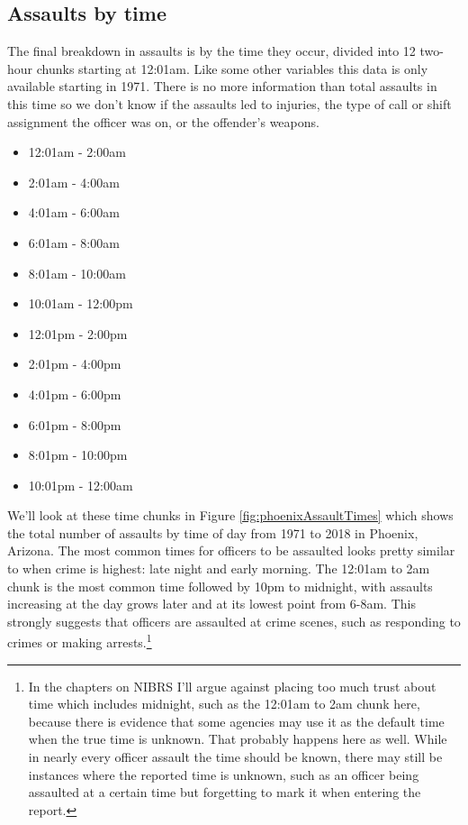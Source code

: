 \documentclass[
  12pt,
  openany]{book}
\providecommand{\tightlist}{%
  \setlength{\itemsep}{0pt}\setlength{\parskip}{0pt}}
\begin{document}
\subsection{Assaults by time}\label{assaults-by-time}

The final breakdown in assaults is by the time they occur, divided into 12 two-hour chunks starting at 12:01am. Like some other variables this data is only available starting in 1971. There is no more information than total assaults in this time so we don't know if the assaults led to injuries, the type of call or shift assignment the officer was on, or the offender's weapons.

\begin{itemize}
\tightlist
\item
  12:01am - 2:00am
\item
  2:01am - 4:00am
\item
  4:01am - 6:00am
\item
  6:01am - 8:00am
\item
  8:01am - 10:00am
\item
  10:01am - 12:00pm
\item
  12:01pm - 2:00pm
\item
  2:01pm - 4:00pm
\item
  4:01pm - 6:00pm
\item
  6:01pm - 8:00pm
\item
  8:01pm - 10:00pm
\item
  10:01pm - 12:00am
\end{itemize}

We'll look at these time chunks in Figure \ref{fig:phoenixAssaultTimes} which shows the total number of assaults by time of day from 1971 to 2018 in Phoenix, Arizona. The most common times for officers to be assaulted looks pretty similar to when crime is highest: late night and early morning. The 12:01am to 2am chunk is the most common time followed by 10pm to midnight, with assaults increasing at the day grows later and at its lowest point from 6-8am. This strongly suggests that officers are assaulted at crime scenes, such as responding to crimes or making arrests.\footnote{In the chapters on NIBRS I'll argue against placing too much trust about time which includes midnight, such as the 12:01am to 2am chunk here, because there is evidence that some agencies may use it as the default time when the true time is unknown. That probably happens here as well. While in nearly every officer assault the time should be known, there may still be instances where the reported time is unknown, such as an officer being assaulted at a certain time but forgetting to mark it when entering the report.}
\end{document}
